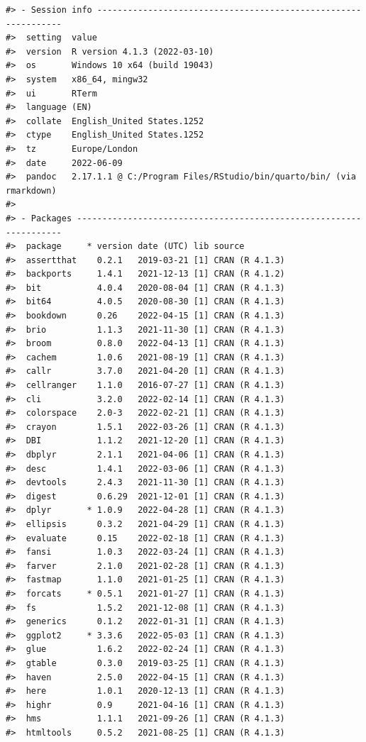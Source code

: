 \documentclass[
]{article}
\begin{document}
\begin{verbatim}
#> - Session info ---------------------------------------------------------------
#>  setting  value
#>  version  R version 4.1.3 (2022-03-10)
#>  os       Windows 10 x64 (build 19043)
#>  system   x86_64, mingw32
#>  ui       RTerm
#>  language (EN)
#>  collate  English_United States.1252
#>  ctype    English_United States.1252
#>  tz       Europe/London
#>  date     2022-06-09
#>  pandoc   2.17.1.1 @ C:/Program Files/RStudio/bin/quarto/bin/ (via rmarkdown)
#> 
#> - Packages -------------------------------------------------------------------
#>  package     * version date (UTC) lib source
#>  assertthat    0.2.1   2019-03-21 [1] CRAN (R 4.1.3)
#>  backports     1.4.1   2021-12-13 [1] CRAN (R 4.1.2)
#>  bit           4.0.4   2020-08-04 [1] CRAN (R 4.1.3)
#>  bit64         4.0.5   2020-08-30 [1] CRAN (R 4.1.3)
#>  bookdown      0.26    2022-04-15 [1] CRAN (R 4.1.3)
#>  brio          1.1.3   2021-11-30 [1] CRAN (R 4.1.3)
#>  broom         0.8.0   2022-04-13 [1] CRAN (R 4.1.3)
#>  cachem        1.0.6   2021-08-19 [1] CRAN (R 4.1.3)
#>  callr         3.7.0   2021-04-20 [1] CRAN (R 4.1.3)
#>  cellranger    1.1.0   2016-07-27 [1] CRAN (R 4.1.3)
#>  cli           3.2.0   2022-02-14 [1] CRAN (R 4.1.3)
#>  colorspace    2.0-3   2022-02-21 [1] CRAN (R 4.1.3)
#>  crayon        1.5.1   2022-03-26 [1] CRAN (R 4.1.3)
#>  DBI           1.1.2   2021-12-20 [1] CRAN (R 4.1.3)
#>  dbplyr        2.1.1   2021-04-06 [1] CRAN (R 4.1.3)
#>  desc          1.4.1   2022-03-06 [1] CRAN (R 4.1.3)
#>  devtools      2.4.3   2021-11-30 [1] CRAN (R 4.1.3)
#>  digest        0.6.29  2021-12-01 [1] CRAN (R 4.1.3)
#>  dplyr       * 1.0.9   2022-04-28 [1] CRAN (R 4.1.3)
#>  ellipsis      0.3.2   2021-04-29 [1] CRAN (R 4.1.3)
#>  evaluate      0.15    2022-02-18 [1] CRAN (R 4.1.3)
#>  fansi         1.0.3   2022-03-24 [1] CRAN (R 4.1.3)
#>  farver        2.1.0   2021-02-28 [1] CRAN (R 4.1.3)
#>  fastmap       1.1.0   2021-01-25 [1] CRAN (R 4.1.3)
#>  forcats     * 0.5.1   2021-01-27 [1] CRAN (R 4.1.3)
#>  fs            1.5.2   2021-12-08 [1] CRAN (R 4.1.3)
#>  generics      0.1.2   2022-01-31 [1] CRAN (R 4.1.3)
#>  ggplot2     * 3.3.6   2022-05-03 [1] CRAN (R 4.1.3)
#>  glue          1.6.2   2022-02-24 [1] CRAN (R 4.1.3)
#>  gtable        0.3.0   2019-03-25 [1] CRAN (R 4.1.3)
#>  haven         2.5.0   2022-04-15 [1] CRAN (R 4.1.3)
#>  here          1.0.1   2020-12-13 [1] CRAN (R 4.1.3)
#>  highr         0.9     2021-04-16 [1] CRAN (R 4.1.3)
#>  hms           1.1.1   2021-09-26 [1] CRAN (R 4.1.3)
#>  htmltools     0.5.2   2021-08-25 [1] CRAN (R 4.1.3)

\end{verbatim}
\end{document}
